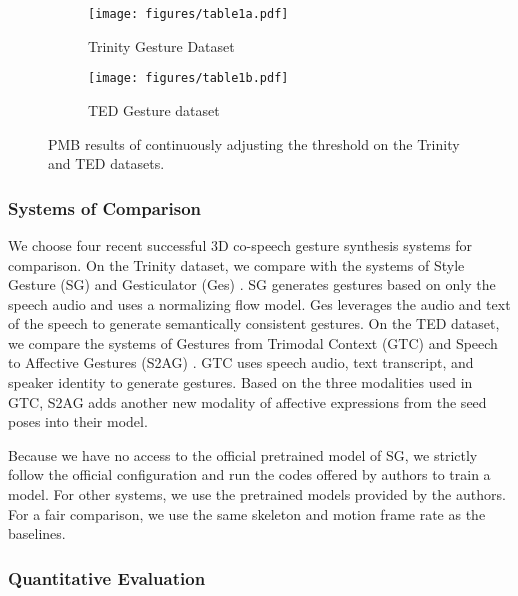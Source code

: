 \documentclass[acmtog,authorversion]{acmart}
\begin{document}
\begin{figure}[t]
    \centering
    \begin{subfigure}[t]{0.47\linewidth}
        \centering
        \texttt{[image: figures/table1a.pdf]}
        \caption{Trinity Gesture Dataset}
        \label{fig:table1a}
    \end{subfigure}
    \hspace{\fill}
    \begin{subfigure}[t]{0.47\linewidth}
        \centering
        \texttt{[image: figures/table1b.pdf]}
        \caption{TED Gesture dataset}
        \label{fig:table1b}
    \end{subfigure}
    \Description{}
    \caption{PMB results of continuously adjusting the threshold  on the Trinity and TED datasets.}
    \label{fig:table1}
\end{figure}

\subsubsection{Systems of Comparison}
We choose four recent successful 3D co-speech gesture synthesis systems for comparison. On the Trinity dataset, we compare with the systems of Style Gesture (SG) \cite{alexanderson2020style} and Gesticulator (Ges) \cite{kucherenko2020gesticulator}. SG generates gestures based on only the speech audio and uses a normalizing flow model. Ges leverages the audio and text of the speech to generate semantically consistent gestures. On the TED dataset, we compare the systems of Gestures from Trimodal Context (GTC) \cite{yoon2020speech} and Speech to Affective Gestures (S2AG) \cite{bhattacharya2021speech2affectivegestures}. GTC uses speech audio, text transcript, and speaker identity to generate gestures. Based on the three modalities used in GTC, S2AG adds another new modality of affective expressions from the seed poses into their model.

Because we have no access to the official pretrained model of SG, we strictly follow the official configuration and run the codes offered by authors to train a model. For other systems, we use the pretrained models provided by the authors. For a fair comparison, we use the same skeleton and motion frame rate as the baselines.

\subsubsection{Quantitative Evaluation}
\end{document}
